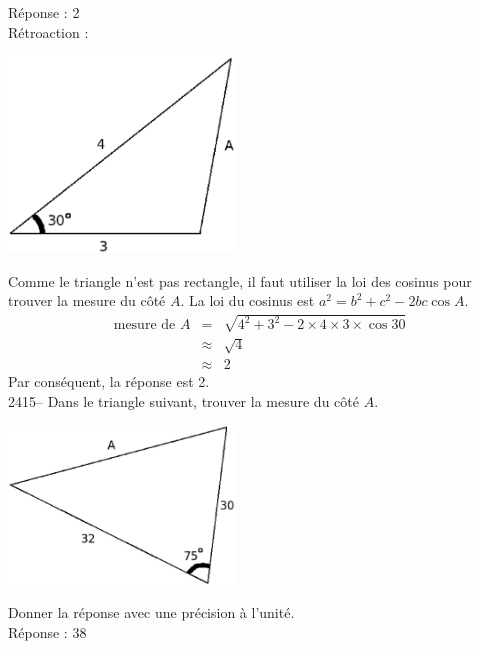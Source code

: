 \documentclass[letterpaper, 12pt]{article}
\begin{document}
R\'eponse : 2\\

R\'etroaction :\\
\begin{center}
 \includegraphics[width=6cm,bb=0 491 494 842]{Q2414.eps}
\end{center}
Comme le triangle n'est pas rectangle, il faut utiliser la loi des cosinus pour trouver la mesure du c\^ot\'e $A$. La loi du cosinus est $a^{2}=b^{2}+c^{2}-2bc\cos{A}$.
\begin{eqnarray*}
 \textrm{mesure de }A &=& \sqrt{4^{2} + 3^{2} - 2 \times 4 \times 3 \times \cos{30}}\\
 &\approx& \sqrt{4}\\
 &\approx& 2
\end{eqnarray*}
Par cons\'equent, la r\'eponse est 2.\\

2415-- Dans le triangle suivant, trouver la mesure du c\^ot\'e $A$.\\
\begin{center}
 \includegraphics[width=6cm,bb=0 491 494 842]{Q2415.eps}
\end{center}
Donner la r\'eponse avec une pr\'ecision \`a l'unit\'e.\\

R\'eponse : 38\\
\end{document}
